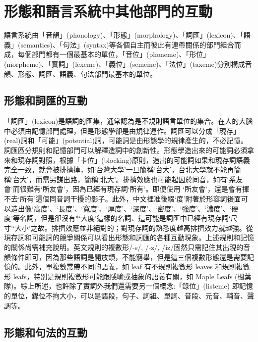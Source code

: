 \section{\rmfamily 形態和語言系統中其他部門的互動}

\textrm{語言系統由「音韻」(phonology)}、\textrm{「形態」(morphology)}、\textrm{「詞匯」(lexicon)}、\textrm{「語義」(semantics)}、\textrm{「句法」(syntax)等各個自主而彼此有連帶關係的部門組合而成，每個部門都有一個最基本的單位，「音位」(phoneme)}、\textrm{「形位」(morpheme)}、\textrm{「實詞」(lexeme)}、\textrm{「義位」(sememe)}、\textrm{「法位」(taxeme)分別構成音韻}、\textrm{形態}、\textrm{詞匯、語義、句法部門最基本的單位。}

\subsection{\rmfamily 形態和詞匯的互動}

\textrm{「詞匯」(lexicon)是語詞的匯集，通常認為是不規則語言單位的集合。在人的大腦中必須由記憶部門處理，但是形態學卻是由規律運作。詞匯可以分成「現存」(real)詞和「可能」(potential)詞，可能詞是由形態學的規律產生的，不必記憶。詞匯區分規則和記憶部門可以解釋造詞中的創新性。形態學造出來的可能詞必須拿來和現存詞對照，根據「卡位」(blocking)原則，造出的可能詞如果和現存詞語義完全一致，就會被排擠掉，如‘台灣大學’一旦簡稱‘台大’}，\textrm{台北大學就不能再簡稱‘台大’}，\textrm{而需另謀出路，簡稱‘北大’}。\textrm{排擠效應也可能起因於同音，如有‘系友會’而很難有‘所友會’}，\textrm{因為已經有現存詞‘所有’}。\textrm{即便使用 ‘所友會’}，\textrm{還是會有揮不去‘所有’這個同音詞干擾的影子。此外，中文裡准後綴‘度’附著於形容詞後面可以造出像‘高度’}、\textrm{‘長度’}、\textrm{‘寬度’}、\textrm{‘厚度’}、\textrm{‘深度’}、\textrm{‘密度’}、\textrm{‘強度’}、\textrm{‘濃度’}、\textrm{‘硬度’等名詞，但是卻沒有*‘大度’這樣的名詞、這可能是詞匯中已經有現存詞‘尺寸’‘大小’之故。排擠效應並非絕對的；對現存詞的熟悉度越高排擠效力就越強。從現存詞和可能詞的競爭關係可以看出形態和詞匯的各種互動現象。上述規則和記憶的關係尚需補充說明。英文規則的複數形/-s/, /-z/, /iz/固然只需記住其出現的音韻條件即可，因為那些語詞是開放類，不能窮舉，但是這三個複數形態還是需要記憶的。此外，單複數常帶不同的語義，如 leaf 有不規則複數形 leaves 和規則複數形 leafs}，\textrm{特別是規則複數形可能跟隱喻或抽象的語義有關，如 Maple Leafs (楓葉隊)。綜上所述，也許除了實詞外我們還需要另一個概念:「錄位」(listeme) 即記憶的單位，錄位不拘大小，可以是語段，句子、詞組、單詞、音段、元音、輔音、聲調等。}

\subsection{\rmfamily 形態和句法的互動}

